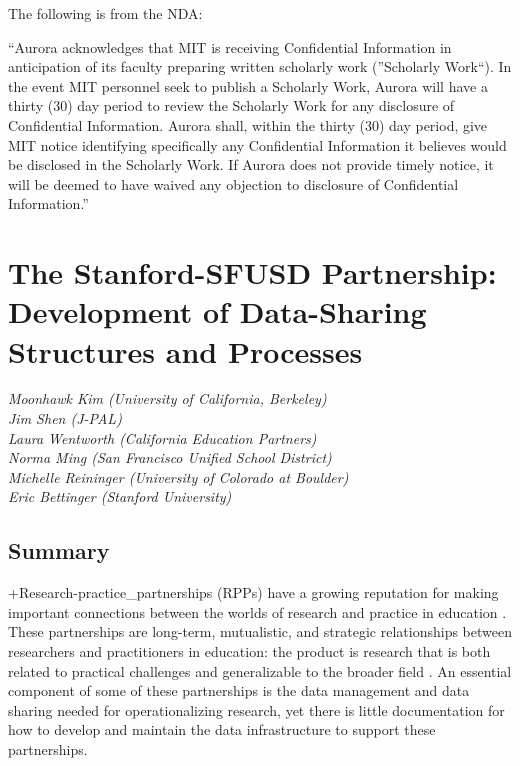 \documentclass[
]{WileySix}
\begin{document}
The following is from the NDA:

``Aurora acknowledges that MIT is receiving Confidential Information in anticipation of its faculty preparing written scholarly work (''Scholarly Work``). In the event MIT personnel seek to publish a Scholarly Work, Aurora will have a thirty (30) day period to review the Scholarly Work for any disclosure of Confidential Information. Aurora shall, within the thirty (30) day period, give MIT notice identifying specifically any Confidential Information it believes would be disclosed in the Scholarly Work. If Aurora does not provide timely notice, it will be deemed to have waived any objection to disclosure of Confidential Information.''

\hypertarget{sfusd}{%
\section{The Stanford-SFUSD Partnership: Development of Data-Sharing Structures and Processes}\label{sfusd}}

\emph{Moonhawk Kim (University of California, Berkeley)}\\
\emph{Jim Shen (J-PAL)}\\
\emph{Laura Wentworth (California Education Partners)}\\
\emph{Norma Ming (San Francisco Unified School District)}\\
\emph{Michelle Reininger (University of Colorado at Boulder)}\\
\emph{Eric Bettinger (Stanford University)}

\hypertarget{summary-6}{%
\subsection{Summary}\label{summary-6}}

+Research-practice\_partnerships\textbar{} (RPPs) have a growing reputation for making important connections between the worlds of research and practice in education \citep{farley-ripple2018, farrell2019}. These partnerships are long-term, mutualistic, and strategic relationships between researchers and practitioners in education: the product is research that is both related to practical challenges and generalizable to the broader field \citep{coburn2013, coburn2016}. An essential component of some of these partnerships is the data management and data sharing needed for operationalizing research, yet there is little documentation for how to develop and maintain the data infrastructure to support these partnerships.
\end{document}
